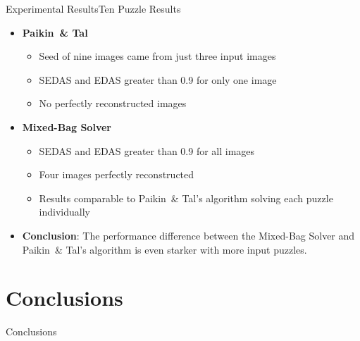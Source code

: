 \documentclass[10pt]{beamer}
\begin{document}
\begin{frame}{Experimental Results}{Ten Puzzle Results}
  	\begin{itemize}
  		\item<1-> \textbf{Paikin~\& Tal}
  		\begin{itemize}
  		  \setlength\itemsep{0.7em}
			  \item Seed of nine images came from just three input images
			  \item SEDAS and EDAS greater than 0.9 for only one image
			  \item No perfectly reconstructed images
		  \end{itemize}
		  \vfill
  	  \item<2-> \textbf{Mixed-Bag Solver}
		  \begin{itemize}
		    \setlength\itemsep{0.7em}
			  \item SEDAS and EDAS greater than 0.9 for all images
			  \item Four images perfectly reconstructed
			  \item Results comparable to Paikin~\& Tal's algorithm solving each puzzle individually
		  \end{itemize}	
		  \vfill
  		\item<3-> \textbf{Conclusion}: The performance difference between the Mixed-Bag Solver and Paikin~\& Tal's algorithm is even starker with more input puzzles.
  \end{itemize}
\end{frame}



\section{Conclusions}
\begin{frame}{Conclusions}{}
\end{frame}
\end{document}
